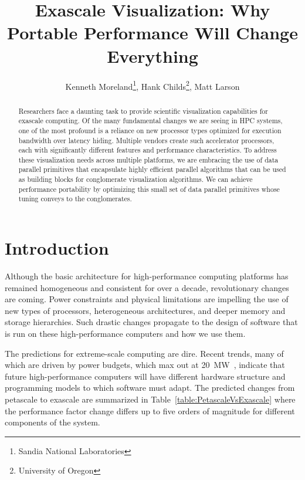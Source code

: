 \documentclass{superfri}
\newcommand*{\lcite}[1]{~\cite{#1}}
\begin{document}
\author{
  Kenneth Moreland\footnote{Sandia National Laboratories},
  Hank Childs\footnote{\label{ou}University of Oregon},
  Matt Larson
  }

\title{Exascale Visualization: Why Portable Performance Will Change Everything}

\maketitle{}

\begin{abstract}%
  \noindent
  Researchers face a daunting task to provide scientific visualization
  capabilities for exascale computing. Of the many fundamental changes we
  are seeing in HPC systems, one of the most profound is a reliance on new
  processor types optimized for execution bandwidth over latency hiding.
  Multiple vendors create such accelerator processors, each with
  significantly different features and performance characteristics. To
  address these visualization needs across multiple platforms, we are
  embracing the use of data parallel primitives that encapsulate highly
  efficient parallel algorithms that can be used as building blocks for
  conglomerate visualization algorithms. We can achieve performance
  portability by optimizing this small set of data parallel primitives
  whose tuning conveys to the conglomerates.

\end{abstract}


\section*{Introduction}
\label{sec:Introduction}

\noindent
Although the basic architecture for high-performance computing platforms has
remained homogeneous and consistent for over a decade, revolutionary changes
are coming. Power constraints and physical limitations are impelling the
use of new types of processors, heterogeneous architectures, and deeper
memory and storage hierarchies. Such drastic changes propagate to the
design of software that is run on these high-performance computers and how
we use them.

The predictions for extreme-scale computing are dire.  Recent trends, many
of which are driven by power budgets, which max out at
20~MW\lcite{ExascaleArchitecturesReport}, indicate that future
high-performance computers will have different hardware structure and
programming models to which software must adapt. The predicted changes from
petascale to exascale are summarized in
Table~\ref{table:PetascaleVsExascale} where the performance factor change
differs up to five orders of magnitude for different components of the
system.
\end{document}
